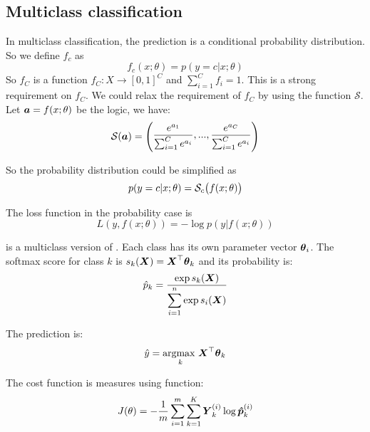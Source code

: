 \subsection{Multiclass classification}

In multiclass classification, the prediction is a conditional probability distribution. So we define $f_c$ as
    \begin{equation}
        f_c(x;\theta) = p(y=c|x;\theta)
    \end{equation}
    So $f_C$ is a function $f_C: X \rightarrow [0,1]^C$ and $\displaystyle \sum_{i=1}^C f_i = 1$. This is a strong requirement on $f_C$. We could relax the requirement of $f_C$ by using the  function $\mathcal{S}$. Let $\boldsymbol{a} = f(x;\theta)$ be the logic, we have:
    \begin{equation}
        \mathcal{S}(\boldsymbol{a}) = \begin{pmatrix}\displaystyle
            \frac{e^{a_1}}{\sum_{i=1}^C e^{a_i}}, ..., \frac{e^{a_C}}{\sum_{i=1}^C e^{a_i}}
        \end{pmatrix}
    \end{equation}
    
    So the probability distribution could be simplified as
    \begin{equation}
        p(y=c|x;\theta) = \mathcal{S}_c \mleft(f(x;\theta)\mright)
    \end{equation}
    
    The loss function in the probability case is 
    \begin{equation}
        L(y, f(x;\theta)) = - \log p(y|f(x;\theta))
    \end{equation}


 is a multiclass version of . Each class has its own parameter vector $\boldsymbol{\theta}_i$. The softmax score for class $k$ is $s_k (\boldsymbol{X} ) = \boldsymbol{X}^\top \boldsymbol{\theta}_k$ and its probability is:
\begin{equation}
    \hat{p}_k = \frac{\exp{{s_k (\boldsymbol{X})}}}{\displaystyle \sum_{i=1}^n \exp{s_i (\boldsymbol{X}) } }
\end{equation}

The prediction is:
\begin{equation}
	\hat{y} = \underset{k}{\text{argmax }} \boldsymbol{X}^\top \boldsymbol{\theta}_k
\end{equation}

The cost function is measures using  function:
\begin{equation}
	J(\theta)= -\frac{1}{m} \sum_{i=1}^m \sum_{k=1}^K \boldsymbol{Y}^{(i)}_k \log \boldsymbol{\hat{p}}^{(i)}_k
\end{equation}


